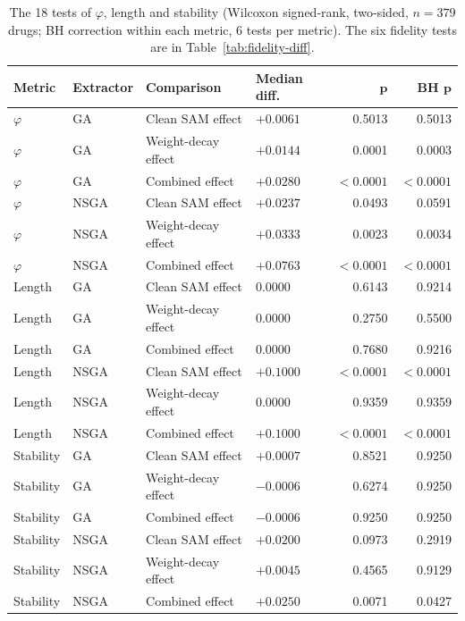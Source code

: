 \begin{table}[htbp]
  \centering
  \caption{The 18 tests of $\varphi$, length and stability (Wilcoxon signed-rank, two-sided, $n = 379$ drugs; BH correction within each metric, 6 tests per metric). The six fidelity tests are in Table~\ref{tab:fidelity-diff}.}
  \label{tab:all-tests}
  \footnotesize
  \renewcommand{\arraystretch}{1.1}
  \begin{tabular}{@{}llllrr@{}}
    \toprule
    \textbf{Metric} & \textbf{Extractor} & \textbf{Comparison} & \textbf{Median diff.} & $\boldsymbol{p}$ & \textbf{BH} $\boldsymbol{p}$ \\
    \midrule
    $\varphi$ & GA   & Clean SAM effect    & $+0.0061$ & 0.5013    & 0.5013 \\
    $\varphi$ & GA   & Weight-decay effect & $+0.0144$ & 0.0001    & 0.0003 \\
    $\varphi$ & GA   & Combined effect     & $+0.0280$ & $<0.0001$ & $<0.0001$ \\
    $\varphi$ & NSGA & Clean SAM effect    & $+0.0237$ & 0.0493    & 0.0591 \\
    $\varphi$ & NSGA & Weight-decay effect & $+0.0333$ & 0.0023    & 0.0034 \\
    $\varphi$ & NSGA & Combined effect     & $+0.0763$ & $<0.0001$ & $<0.0001$ \\
    \midrule
    Length    & GA   & Clean SAM effect    & 0.0000    & 0.6143    & 0.9214 \\
    Length    & GA   & Weight-decay effect & 0.0000    & 0.2750    & 0.5500 \\
    Length    & GA   & Combined effect     & 0.0000    & 0.7680    & 0.9216 \\
    Length    & NSGA & Clean SAM effect    & $+0.1000$ & $<0.0001$ & $<0.0001$ \\
    Length    & NSGA & Weight-decay effect & 0.0000    & 0.9359    & 0.9359 \\
    Length    & NSGA & Combined effect     & $+0.1000$ & $<0.0001$ & $<0.0001$ \\
    \midrule
    Stability & GA   & Clean SAM effect    & $+0.0007$ & 0.8521    & 0.9250 \\
    Stability & GA   & Weight-decay effect & $-0.0006$ & 0.6274    & 0.9250 \\
    Stability & GA   & Combined effect     & $-0.0006$ & 0.9250    & 0.9250 \\
    Stability & NSGA & Clean SAM effect    & $+0.0200$ & 0.0973    & 0.2919 \\
    Stability & NSGA & Weight-decay effect & $+0.0045$ & 0.4565    & 0.9129 \\
    Stability & NSGA & Combined effect     & $+0.0250$ & 0.0071    & 0.0427 \\
    \bottomrule
  \end{tabular}
\end{table}

